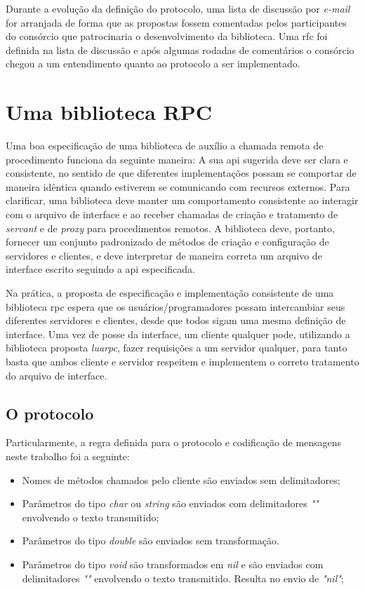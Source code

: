 \documentclass[11pt]{article}
\begin{document}
Durante a evolução da definição do protocolo, uma lista de discussão por
\textit{e-mail} for arranjada de forma que as propostas fossem
comentadas pelos participantes do consórcio que patrocinaria o desenvolvimento
da biblioteca. Uma \gls{rfc} foi definida na lista de discussão e após algumas
rodadas de comentários o consórcio chegou a um entendimento quanto
ao protocolo a ser implementado.

\section{Uma biblioteca RPC}\label{sec:rpc}

Uma boa especificação de uma biblioteca de auxílio a chamada remota de
procedimento funciona da seguinte maneira: A sua \gls{api} sugerida deve ser
clara e consistente, no sentido de que diferentes implementações possam se
comportar de maneira idêntica quando estiverem se comunicando com recursos
externos. Para clarificar, uma biblioteca deve manter um comportamento
consistente ao interagir com o arquivo de interface e ao receber chamadas de
criação e tratamento de \textit{servant} e de \textit{proxy} para procedimentos remotos.
A biblioteca deve,
portanto, fornecer um conjunto padronizado de métodos de criação e configuração
de servidores e clientes, e deve interpretar de maneira correta um arquivo de
interface escrito seguindo a \gls{api} especificada.

Na prática, a proposta de especificação e implementação consistente de uma
biblioteca \gls{rpc} espera que os usuários/programadores possam intercambiar
seus diferentes servidores e clientes, desde que todos sigam uma mesma definição
de interface. Uma vez de posse da interface, um cliente qualquer pode,
utilizando a biblioteca proposta \textit{luarpc}, fazer requisições a um
servidor qualquer, para tanto basta que ambos cliente e servidor respeitem e
implementem o correto tratamento do arquivo de interface.

\subsection{O protocolo}\label{subsec:proto}

Particularmente, a regra definida para o protocolo e codificação de mensagens
neste trabalho foi a seguinte:

\begin{itemize}
\item
Nomes de métodos chamados pelo cliente são enviados sem delimitadores;
\item
Parâmetros do tipo \textit{char} ou \textit{string} são enviados com delimitadores
\textit{""} envolvendo o texto transmitido;
\item
Parâmetros do tipo \textit{double} são enviados sem transformação.
\item
Parâmetros do tipo \textit{void} são transformados em \textit{nil} e são enviados
com delimitadores \textit{""} envolvendo o texto transmitido. Resulta no envio
de \textit{"nil"};
\end{itemize}
\end{document}
